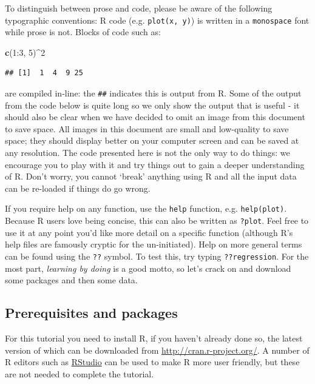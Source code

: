 \documentclass[]{article}
\newenvironment{Shaded}{}{}
\newcommand{\KeywordTok}[1]{\textcolor[rgb]{0.00,0.44,0.13}{\textbf{{#1}}}}
\newcommand{\DecValTok}[1]{\textcolor[rgb]{0.25,0.63,0.44}{{#1}}}
\newcommand{\NormalTok}[1]{{#1}}
\begin{document}
To distinguish between prose and code, please be aware of the following
typographic conventions: R code (e.g. \texttt{plot(x, y)}) is written in
a \texttt{monospace} font while prose is not. Blocks of code such as:

\begin{Shaded}
\begin{Highlighting}[]
\KeywordTok{c}\NormalTok{(}\DecValTok{1}\NormalTok{:}\DecValTok{3}\NormalTok{, }\DecValTok{5}\NormalTok{)^}\DecValTok{2}
\end{Highlighting}
\end{Shaded}
\begin{verbatim}
## [1]  1  4  9 25
\end{verbatim}
are compiled in-line: the \texttt{\#\#} indicates this is output from R.
Some of the output from the code below is quite long so we only show the
output that is useful - it should also be clear when we have decided to
omit an image from this document to save space. All images in this
document are small and low-quality to save space; they should display
better on your computer screen and can be saved at any resolution. The
code presented here is not the only way to do things: we encourage you
to play with it and try things out to gain a deeper understanding of R.
Don't worry, you cannot `break' anything using R and all the input data
can be re-loaded if things do go wrong.

If you require help on any function, use the \texttt{help} function,
e.g. \texttt{help(plot)}. Because R users love being concise, this can
also be written as \texttt{?plot}. Feel free to use it at any point
you'd like more detail on a specific function (although R's help files
are famously cryptic for the un-initiated). Help on more general terms
can be found using the \texttt{??} symbol. To test this, try typing
\texttt{??regression}. For the most part, \emph{learning by doing} is a
good motto, so let's crack on and download some packages and then some
data.

\subsection{Prerequisites and packages}

For this tutorial you need to install R, if you haven't already done so,
the latest version of which can be downloaded from
\href{http://cran.r-project.org/}{http://cran.r-project.org/}. A number
of R editors such as \href{http://www.rstudio.com/}{RStudio} can be used
to make R more user friendly, but these are not needed to complete the
tutorial.
\end{document}
